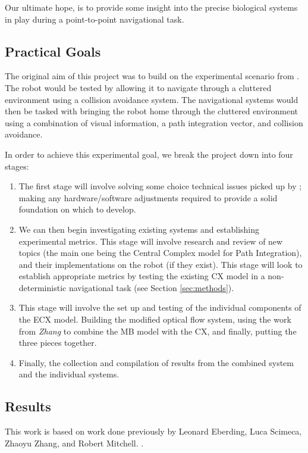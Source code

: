 \documentclass[a4paper,11pt,twoside,openright]{article}
\begin{document}
Our ultimate hope, is to provide some insight into the precise biological
systems in play during a point-to-point navigational task.

\subsection { Practical Goals }
The original aim of this project was to build on the experimental
scenario from \cite{Mitchell2018}. The robot would be tested by
allowing it to navigate through a cluttered environment using a
collision avoidance system. The navigational systems would then be
tasked with bringing the robot home through the cluttered environment
using a combination of visual information, a path integration vector,
and collision avoidance.
\newline
\par

In order to achieve this experimental goal, we break the project down
into four stages:

\begin{enumerate}
\item{The first stage will involve solving some choice technical issues
  picked up by \cite{Mitchell2018}; making any hardware/software adjustments
  required to provide a solid foundation on which to develop.}

\item{We can then begin investigating existing systems and establishing
  experimental metrics. This stage will involve research and review of new topics
  (the main one being the Central Complex model for Path Integration), and their
implementations on the robot (if they exist). This stage will look to establish
appropriate metrics by testing the existing CX model in a non-deterministic
navigational task (see Section \ref{sec:methods}).}

\item{This stage will involve the set up and testing of the individual components
  of the ECX model. Building the modified optical flow system, using the work
  from \textit{Zhang} to combine the MB model with the CX, and finally, putting
  the three pieces together.}

\item{Finally, the collection and compilation of results from the combined system
and the individual systems.}
\end{enumerate}

\subsection { Results }
This work is based on work done previously by Leonard Eberding, Luca Scimeca,
Zhaoyu Zhang, and Robert Mitchell.
\cite{Eberding2016, Scimeca2017, Zhang2017, Mitchell2018}.
\newline
\end{document}
